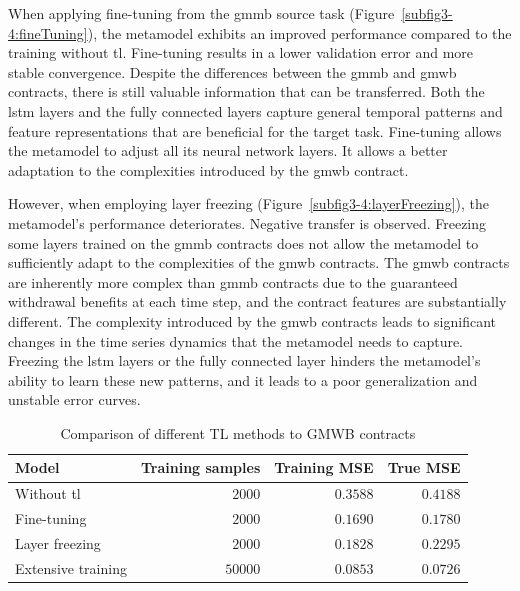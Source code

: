 When applying fine-tuning from the \gls{gmmb} source task (Figure~\ref{subfig3-4:fineTuning}), the metamodel exhibits an improved performance compared to the training without \gls{tl}. 
Fine-tuning results in a lower validation error and more stable convergence.
Despite the differences between the \gls{gmmb} and \gls{gmwb} contracts, there is still valuable information that can be transferred. 
Both the \gls{lstm} layers and the fully connected layers capture general temporal patterns and feature representations that are beneficial for the target task. 
Fine-tuning allows the metamodel to adjust all its neural network layers. 
It allows a better adaptation to the complexities introduced by the \gls{gmwb} contract.

However, when employing layer freezing (Figure~\ref{subfig3-4:layerFreezing}), the metamodel's performance deteriorates.
Negative transfer is observed.
Freezing some layers trained on the \gls{gmmb} contracts does not allow the metamodel to sufficiently adapt to the complexities of the \gls{gmwb} contracts. 
The \gls{gmwb} contracts are inherently more complex than \gls{gmmb} contracts due to the guaranteed withdrawal benefits at each time step, and the contract features are substantially different.
The complexity introduced by the \gls{gmwb} contracts leads to significant changes in the time series dynamics that the metamodel needs to capture.
Freezing the \gls{lstm} layers or the fully connected layer hinders the metamodel's ability to learn these new patterns, and it leads to a poor generalization and unstable error curves.

\begin{table}[ht!]
    \centering
    \begin{tabular}{lrrr}
        \toprule
        \textbf{Model} & \textbf{Training samples} & \textbf{Training MSE} & \textbf{True MSE} \\
        \midrule
        Without \gls{tl} & $\num{2000}$ & $0.3588$ & $0.4188$ \\
        Fine-tuning & $\num{2000}$ & $0.1690$ & $0.1780$ \\
        Layer freezing & $\num{2000}$ & $0.1828$ & $0.2295$ \\
        Extensive training & $\num{50000}$ & $0.0853$ & $0.0726$ \\
        \bottomrule
    \end{tabular}
    \caption{Comparison of different TL methods to GMWB contracts}
    \label{tab3:transfer_learning_results_gmwb}
\end{table}

